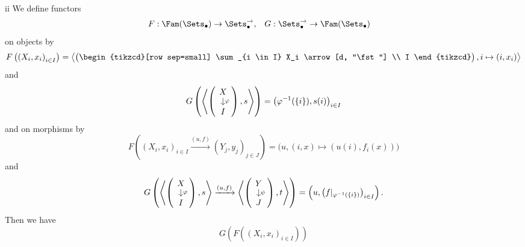 \begin{partsolution}{ii}
We define functors
\begin{align*}
F &: \Fam(\Sets_{\bullet}) \to \Sets_{\bullet}^{\rightarrow}, &
G &: \Sets_{\bullet}^{\rightarrow} \to \Fam(\Sets_{\bullet})
\end{align*}
on objects by
\begin{equation*}
F\left(\left(X_i, x_i\right)_{i \in I}\right)
= \left\langle\begin{pmatrix}
\begin{tikzcd}[row sep=small]
\sum_{i \in I} X_i \arrow[d, "\fst"] \\ I
\end{tikzcd}
\end{pmatrix}, i \mapsto (i, x_i)\right\rangle
\end{equation*}
and
\begin{equation*}
G\left(\left\langle
\begin{pmatrix}
\begin{tikzcd}[row sep=small]
X \arrow[d, "\varphi"] \\ I
\end{tikzcd}
\end{pmatrix}, s
\right\rangle\right)
= \left(\varphi^{-1}(\{i\}), s(i)\right)_{i \in I}
\end{equation*}
and on morphisms by
\begin{equation*}
F\left(\left(X_i, x_i\right)_{i \in I} \xrightarrow{(u, f)} \left(Y_j, y_j\right)_{j \in J}\right)
= \big(u, (i, x) \mapsto (u(i), f_i(x))\big)
\end{equation*}
and
\begin{equation*}
G\left(
\left\langle
\begin{pmatrix}
\begin{tikzcd}[row sep=small]
X \arrow[d, "\varphi"] \\ I
\end{tikzcd}
\end{pmatrix}, s
\right\rangle
\xrightarrow{(u, f)}
\left\langle
\begin{pmatrix}
\begin{tikzcd}[row sep=small]
Y \arrow[d, "\psi"] \\ J
\end{tikzcd}
\end{pmatrix}, t
\right\rangle
\right)
= \left(u, \left(f|_{\varphi^{-1}(\{i\})}\right)_{i \in I}\right).
\end{equation*}
Then we have
\begin{equation*}
G\left(F\left(\left(X_i, x_i\right)_{i \in I}\right)\right)

\end{equation*}
\end{partsolution}
